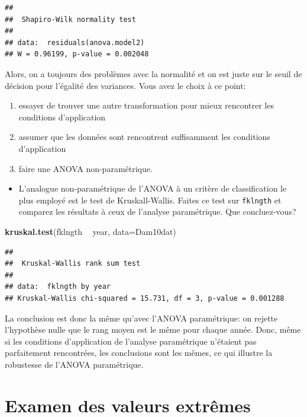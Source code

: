 \documentclass[12pt,]{book}
\newenvironment{Shaded}{\begin{snugshade}}{\end{snugshade}}
\newcommand{\DataTypeTok}[1]{\textcolor[rgb]{0.27,0.27,0.27}{#1}}
\newcommand{\KeywordTok}[1]{\textcolor[rgb]{0.27,0.27,0.27}{\textbf{#1}}}
\newcommand{\NormalTok}[1]{#1}
\newcommand{\OperatorTok}[1]{\textcolor[rgb]{0.43,0.43,0.43}{\textbf{#1}}}
\newcommand{\StringTok}[1]{\textcolor[rgb]{0.5,0.5,0.5}{#1}}
\providecommand{\tightlist}{%
  \setlength{\itemsep}{0pt}\setlength{\parskip}{0pt}}
\begin{document}
\begin{verbatim}
## 
## 	Shapiro-Wilk normality test
## 
## data:  residuals(anova.model2)
## W = 0.96199, p-value = 0.002048
\end{verbatim}

Alors, on a toujours des problèmes avec la normalité et on est juste sur le seuil de décision pour l'égalité des variances. Vous avez le choix à ce point:

\begin{enumerate}
\def\labelenumi{\arabic{enumi}.}
\tightlist
\item
  essayer de trouver une autre transformation pour mieux rencontrer les conditions d'application
\item
  assumer que les données sont rencontrent suffisamment les conditions d'application
\item
  faire une ANOVA non-paramétrique.
\end{enumerate}

\begin{itemize}
\tightlist
\item
  L'analogue non-paramétrique de l'ANOVA à un critère de classification le plus employé est le test de Kruskall-Wallis. Faites ce test sur \texttt{fklngth} et comparez les résultats à ceux de l'analyse paramétrique. Que concluez-vous?
\end{itemize}

\begin{Shaded}
\begin{Highlighting}[]
\KeywordTok{kruskal.test}\NormalTok{(fklngth }\OperatorTok{~}\StringTok{ }\NormalTok{year, }\DataTypeTok{data=}\NormalTok{Dam10dat)}
\end{Highlighting}
\end{Shaded}

\begin{verbatim}
## 
## 	Kruskal-Wallis rank sum test
## 
## data:  fklngth by year
## Kruskal-Wallis chi-squared = 15.731, df = 3, p-value = 0.001288
\end{verbatim}

La conclusion est donc la même qu'avec l'ANOVA paramétrique: on rejette l'hypothèse nulle que le rang moyen est le même pour chaque année. Donc, même si les conditions d'application de l'analyse paramétrique n'étaient pas parfaitement rencontrées, les conclusions sont les mêmes, ce qui illustre la robustesse de l'ANOVA paramétrique.

\hypertarget{examen-des-valeurs-extruxeames}{%
\section{Examen des valeurs extrêmes}\label{examen-des-valeurs-extruxeames}}
\end{document}
